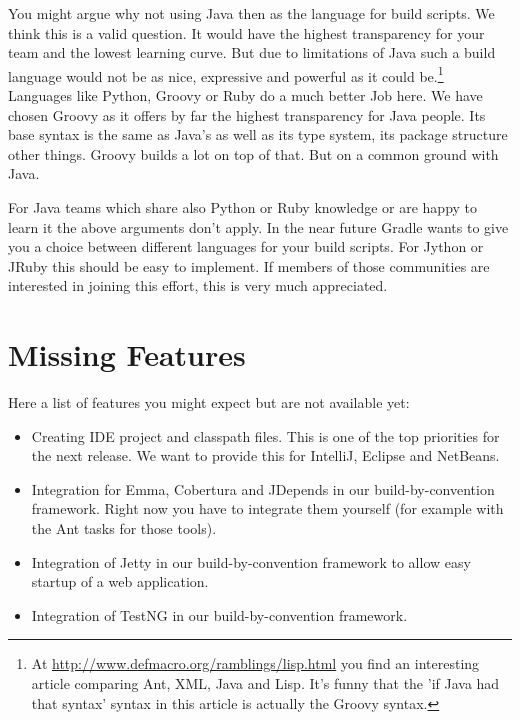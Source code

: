 You might argue why not using Java then as the language for build scripts. We think this is a valid question. It would have the highest transparency for your team and the lowest learning curve. But due to limitations of Java such a build language would not be as nice, expressive and powerful as it could be.\footnote{At \url{http://www.defmacro.org/ramblings/lisp.html} you find an interesting article comparing Ant, XML, Java and Lisp. It's funny that the 'if Java had that syntax' syntax in this article is actually the Groovy syntax.} Languages like Python, Groovy or Ruby do a much better Job here. We have chosen Groovy as it offers by far the highest transparency for Java people. Its base syntax is the same as Java's as well as its type system, its package structure other things. Groovy builds a lot on top of that. But on a common ground with Java.

For Java teams which share also Python or Ruby knowledge or are happy to learn it the above arguments don't apply. In the near future Gradle wants to give you a choice between different languages for your build scripts. For Jython or JRuby this should be easy to implement. If members of those communities are interested in joining this effort, this is very much appreciated. 

\section{Missing Features} %
\label{sec:still_missing}
Here a list of features you might expect but are not available yet:
\begin{itemize}
	\item Creating IDE project and classpath files. This is one of the top priorities for the next release. We want to provide this for IntelliJ, Eclipse and NetBeans.
	\item Integration for Emma, Cobertura and JDepends in our build-by-convention framework. Right now you have to integrate them yourself (for example with the Ant tasks for those tools).
	\item Integration of Jetty in our build-by-convention framework to allow easy startup of a web application.
	\item Integration of TestNG in our build-by-convention framework.
\end{itemize}

